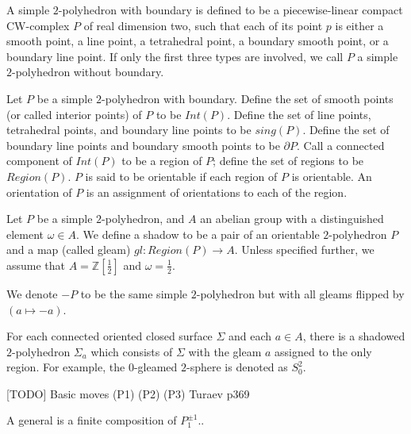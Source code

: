 \begin{definition}\label{def/simple-2-polyhedron}
  A simple $2$-polyhedron with boundary is defined to be a
  piecewise-linear compact CW-complex $P$ of real dimension two,
  such that each of its point $p$ is either a smooth point, a
  line point, a tetrahedral point, a boundary smooth point, or a
  boundary line point. If only the first three types are
  involved, we call $P$ a simple $2$-polyhedron without boundary.
\end{definition}

\begin{definition}\label{def/components-of-a-simple-2-polyhedron}
  Let $P$ be a simple $2$-polyhedron with boundary. Define the
  set of smooth points (or called interior points) of $P$ to be
  $Int(P)$. Define the set of line points, tetrahedral points,
  and boundary line points to be $sing(P)$. Define the set of
  boundary line points and boundary smooth points to be
  $\partial P$. Call a connected component of $Int(P)$ to be a
  region of $P$; define the set of regions to be $Region(P)$. $P$
  is said to be orientable if each region of $P$ is orientable.
  An orientation of $P$ is an assignment of orientations to each
  of the region.
\end{definition}

\begin{definition}\label{def/shadowed-2-polyhedron}
  Let $P$ be a simple $2$-polyhedron, and $A$ an abelian group
  with a distinguished element $\omega \in A$. We define a shadow
  to be a pair of an orientable $2$-polyhedron $P$ and a map
  (called gleam) $gl: Region(P) \to A$. Unless specified further,
  we assume that $A = \mathbb{Z}\left[\frac{1}{2}\right]$ and
  $\omega = \frac{1}{2}$.

  \noindent We denote $-P$ to be the same simple $2$-polyhedron
  but with all gleams flipped by $(a \mapsto -a)$.
\end{definition}

For each connected oriented closed surface $\Sigma$ and each
$a \in A$, there is a shadowed $2$-polyhedron $\Sigma_{a}$ which
consists of $\Sigma$ with the gleam $a$ assigned to the only
region. For example, the $0$-gleamed $2$-sphere is denoted as
$S^{2}_{0}$.

\begin{definition}\label{def/shadow-moves}
  [TODO]
Basic moves
  (P1)
  (P2)
  (P3)
  Turaev p369

  A general is a finite composition of $P_1^{\pm 1}$..
\end{definition}

